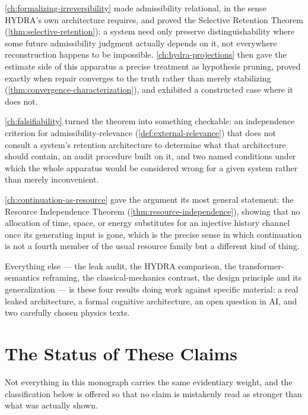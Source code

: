 \documentclass[11pt]{book}
\theoremstyle{plain}
\theoremstyle{definition}
\theoremstyle{remark}
\begin{document}
\cref{ch:formalizing-irreversibility} made admissibility relational,
in the sense HYDRA's own architecture requires, and proved the
Selective Retention Theorem (\cref{thm:selective-retention}): a system
need only preserve distinguishability where some future admissibility
judgment actually depends on it, not everywhere reconstruction happens
to be impossible. \cref{ch:hydra-projections} then gave the estimate
side of this apparatus a precise treatment as hypothesis pruning,
proved exactly when repair converges to the truth rather than merely
stabilizing (\cref{thm:convergence-characterization}), and exhibited a
constructed case where it does not.

\cref{ch:falsifiability} turned the theorem into something checkable:
an independence criterion for admissibility-relevance
(\cref{def:external-relevance}) that does not consult a system's
retention architecture to determine what that architecture should
contain, an audit procedure built on it, and two named conditions
under which the whole apparatus would be considered wrong for a given
system rather than merely inconvenient.

\cref{ch:continuation-as-resource} gave the argument its most general
statement: the Resource Independence Theorem
(\cref{thm:resource-independence}), showing that no allocation of
time, space, or energy substitutes for an injective history channel
once its generating input is gone, which is the precise sense in which
continuation is not a fourth member of the usual resource family but a
different kind of thing.

Everything else --- the leak audit, the HYDRA comparison, the
transformer-semantics reframing, the classical-mechanics contrast, the
design principle and its generalization --- is these four results
doing work against specific material: a real leaked architecture, a
formal cognitive architecture, an open question in AI, and two
carefully chosen physics texts.

\section{The Status of These Claims}

Not everything in this monograph carries the same evidentiary weight,
and the classification below is offered so that no claim is
mistakenly read as stronger than what was actually shown.
\end{document}

